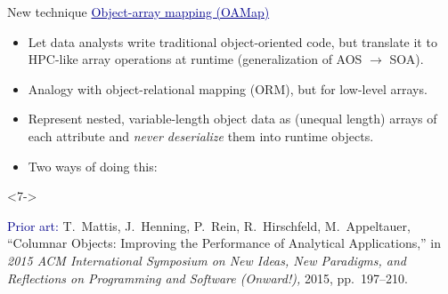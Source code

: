 \documentclass[aspectratio=169]{beamer}
\begin{document}
\begin{frame}{New technique}
\vspace{0.35 cm}
\textcolor{darkblue}{\large \underline{Object-array mapping (OAMap)}}

\vspace{0.15 cm}
\begin{itemize}\setlength{\itemsep}{0.15 cm}
\item Let data analysts write traditional object-oriented code, but translate it to HPC-like array operations at runtime (generalization of AOS $\to$ SOA).
\item<2-> Analogy with object-relational mapping (ORM), but for low-level arrays.
\item<3-> Represent nested, variable-length object data as (unequal length) arrays of each attribute and {\it never deserialize} them into runtime objects.
\item<4-> Two ways of doing this:

\vspace{0.05 cm}
\end{itemize}

\vspace{0.2 cm}
\begin{uncoverenv}<7->
\begin{minipage}{\linewidth}
\scriptsize \textcolor{darkblue}{Prior art:} T.\ Mattis, J.\ Henning, P.\ Rein, R.\ Hirschfeld, M.\ Appeltauer, ``Columnar Objects: Improving the Performance of Analytical Applications,'' in {\it 2015 ACM International Symposium on New Ideas, New Paradigms, and Reflections on Programming and Software (Onward!),} 2015, pp.\ 197--210.
\end{minipage}
\end{uncoverenv}
\end{frame}
\end{document}
